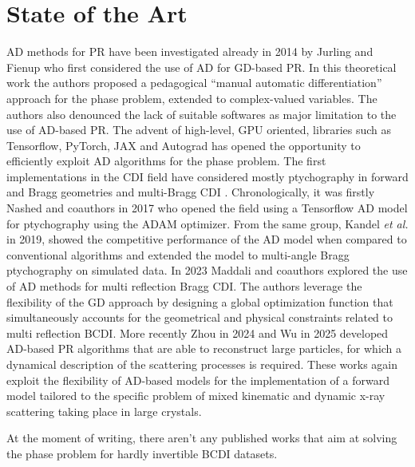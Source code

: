 \section{State of the Art}
AD methods for PR have been investigated already in 2014 by Jurling and Fienup \cite{Fienup_AD} who first considered the use of 
AD for GD-based PR. In this theoretical work the authors proposed a pedagogical ``manual automatic 
differentiation'' approach for the phase problem, extended to complex-valued variables. The authors also denounced the 
lack of suitable softwares as major limitation to the use of AD-based PR. The advent of high-level, GPU oriented, libraries such 
as Tensorflow, PyTorch, JAX and Autograd has opened the opportunity to efficiently exploit AD algorithms for the phase problem. 
The first implementations in the CDI field have considered mostly ptychography in forward and Bragg geometries \cite{Nashed_2017, Kandel_2019} 
and multi-Bragg CDI \cite{Maddali_2023}. Chronologically, it was firstly Nashed and coauthors in 2017 \cite{Nashed_2017} 
who opened the field using a Tensorflow AD model for ptychography using the ADAM optimizer. From the same group, Kandel 
\textit{et al.} in 2019, showed the competitive performance of the AD model when compared to conventional algorithms and 
extended the model to multi-angle Bragg ptychography on simulated data. In 2023 Maddali and coauthors \cite{Maddali_2023} explored 
the use of AD methods for multi reflection Bragg CDI. The authors leverage the flexibility of the GD approach by designing a global 
optimization function that simultaneously accounts for the geometrical and physical constraints related to multi reflection 
BCDI. More recently Zhou in 2024 \cite{Tagaki_2024} and Wu in 2025 \cite{tagaki_2025} developed AD-based PR algorithms that 
are able to reconstruct large particles, for which a dynamical description of the scattering processes is required. These 
works again exploit the flexibility of AD-based models for the implementation of a forward model tailored to the specific 
problem of mixed kinematic and dynamic x-ray scattering taking place in large crystals. 

At the moment of writing, there aren't any published works that aim at solving the phase problem for hardly invertible BCDI 
datasets.


